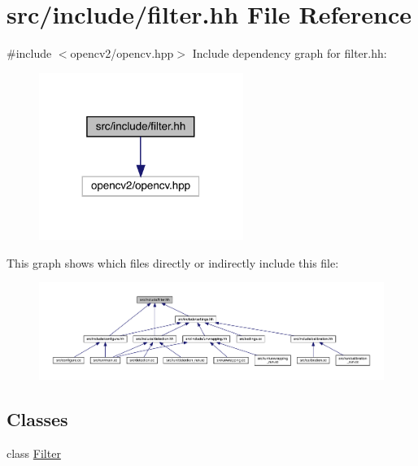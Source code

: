 \hypertarget{filter_8hh}{}\section{src/include/filter.hh File Reference}
\label{filter_8hh}
{\ttfamily \#include $<$opencv2/opencv.\+hpp$>$}\newline
Include dependency graph for filter.\+hh\+:
\nopagebreak
\begin{figure}[H]
\begin{center}
\leavevmode
\includegraphics[width=188pt]{filter_8hh__incl}
\end{center}
\end{figure}
This graph shows which files directly or indirectly include this file\+:
\nopagebreak
\begin{figure}[H]
\begin{center}
\leavevmode
\includegraphics[width=350pt]{filter_8hh__dep__incl}
\end{center}
\end{figure}
\subsection*{Classes}
\begin{DoxyCompactItemize}
\item 
class \mbox{\hyperlink{class_filter}{Filter}}
\end{DoxyCompactItemize}
